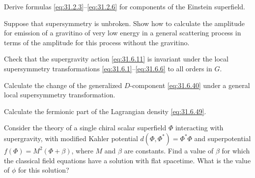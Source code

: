 
\begin{enumerate}
   Derive formulas \eqref{eq:31.2.3}--\eqref{eq:31.2.6} for
  components of the Einstein superfield.

   Suppose that supersymmetry is unbroken. Show how to calculate
  the amplitude for emission of a gravitino of very low energy in a
  general scattering process in terms of the amplitude for this process
  without the gravitino.

   Check that the supergravity action \eqref{eq:31.6.11} is
  invariant under the local supersymmetry transformations
  \eqref{eq:31.6.1}--\eqref{eq:31.6.6} to all orders in \(G\).

   Calculate the change of the generalized \(D\)-component
  \eqref{eq:31.6.40} under a general local supersymmetry transformation.

   Calculate the fermionic part of the Lagrangian density
  \eqref{eq:31.6.49}.

   Consider the theory of a single chiral scalar superfield
  \(\Phi\) interacting with supergravity, with modified Kahler
  potential \(d(\Phi,\Phi^*)=\Phi^*\Phi\) and superpotential
  \(f(\Phi)=M^2(\Phi+\beta)\), where \(M\) and \(\beta\) are constants.
  Find a value of \(\beta\) for which the classical field equations
  have a solution with flat spacetime. What is the value of \(\phi\)
  for this solution?
\end{enumerate}
